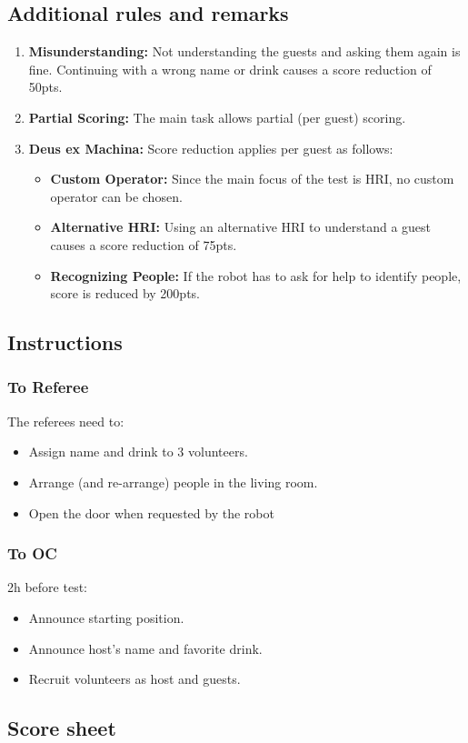 \subsection*{Additional rules and remarks}
\begin{enumerate}[nosep]
	\item \textbf{Misunderstanding:} Not understanding the guests and asking them again is fine. Continuing with a wrong name or drink causes a score reduction of 50pts.
		
	\item \textbf{Partial Scoring:} The main task allows partial (per guest) scoring.
	
	\item \textbf{Deus ex Machina:} Score reduction applies per guest as follows:
	\begin{itemize}[nosep]
		\item \textbf{Custom Operator:} Since the main focus of the test is HRI, no custom operator can be chosen.
		\item \textbf{Alternative HRI:} Using an alternative HRI to understand a guest causes a score reduction of 75pts.
		\item \textbf{Recognizing People:} If the robot has to ask for help to identify people, score is reduced by 200pts. 
	\end{itemize}
\end{enumerate}


\subsection*{Instructions}

\subsubsection*{To Referee}

The referees need to:
\begin{itemize}
	\item Assign name and drink to 3 volunteers.
	\item Arrange (and re-arrange) people in the living room.
	\item Open the door when requested by the robot
\end{itemize}

\subsubsection*{To OC}

2h before test:
\begin{itemize}
	\item Announce starting position.
	\item Announce host's name and favorite drink.
	\item Recruit volunteers as host and guests.
\end{itemize}

\subsection*{Score sheet}


